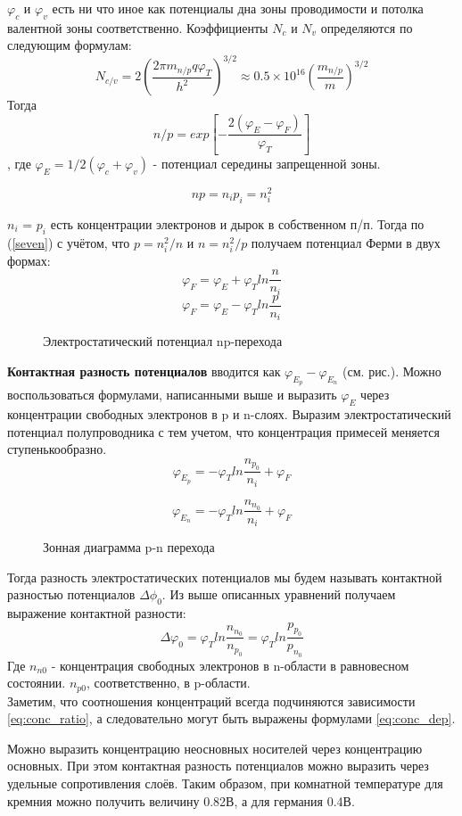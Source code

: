 $\varphi_c$ и $\varphi_v$ есть ни что иное как потенциалы дна зоны проводимости и потолка валентной зоны соответственно. Коэффициенты $N_c$ и $N_v$ определяются по следующим формулам:
$$
N_{c/v} = 2\left(\frac{2\pi m_{n/p}q\varphi_T}{h^2}\right)^{3/2} \approx 0.5\times10^{16}\left(\frac{m_{n/p}}{m}\right)^{3/2}
$$
Тогда
\begin{equation}
n/p = exp\left[-\frac{2(\varphi_E - \varphi_F)}{\varphi_T}\right]
\label{seven}
\end{equation},
где $\varphi_E = 1/2(\varphi_c + \varphi_v)$ - потенциал середины запрещенной зоны.

$$
np = n_ip_i=n_i^2
$$

$n_i$ = $p_i$ есть концентрации электронов и дырок в собственном п/п. Тогда по (\ref{seven}) с учётом, что $p=n_i^2/n$ и $n = n_i^2/p$ получаем потенциал Ферми в двух формах:
$$
\varphi_F = \varphi_E + \varphi_Tln\frac{n}{n_i}
$$
$$
\varphi_F = \varphi_E - \varphi_Tln\frac{p}{n_i}
$$


\begin{center}
	\begin{figure}[h!]
		\caption{Электростатический потенциал np-перехода}	
		\label{pic:pn-phi}
	\end{figure}
\end{center}


\textbf{Контактная разность потенциалов} вводится как $\varphi_{E_p} - \varphi_{E_n}$ (см. рис.). Можно воспользоваться формулами, написанными выше и выразить $\varphi_E$ через концентрации свободных электронов в p и n-слоях.
Выразим электростатический потенциал полупроводника с тем учетом, что концентрация примесей меняется ступенькообразно.\\
$$
\varphi_{E_p} = -\varphi_Tln\frac{n_{p_0}}{n_i} + \varphi_F
$$

$$
\varphi_{E_n} = -\varphi_Tln\frac{n_{n_0}}{n_i} + \varphi_F
$$ 

\begin{center}
	\begin{figure}[h!]
		\caption{Зонная диаграмма p-n перехода}	
		\label{2D}
	\end{figure}
\end{center}


Тогда разность электростатических потенциалов мы будем называть контактной разностью потенциалов $ \Delta \phi_0$. Из выше описанных уравнений получаем выражение контактной разности:
\begin{equation}
\Delta\varphi_0 = \varphi_Tln\frac{n_{n_0}}{n_{p_0}} = \varphi_Tln\frac{p_{p_0}}{p_{n_0}}
\label{eq:main2side_ratio}
\end{equation}
Где $n_{n0}$ - концентрация свободных электронов в n-области в равновесном состоянии. $n_{p0}$, соответственно, в p-области.\\
Заметим, что соотношения концентраций всегда подчиняются зависимости \ref{eq:conc_ratio}, а следовательно могут быть выражены формулами \ref{eq:conc_dep}.


Можно выразить концентрацию неосновных носителей через концентрацию основных. При этом контактная разность потенциалов можно выразить через удельные сопротивления слоёв. Таким образом, при комнатной температуре для кремния можно получить величину 0.82В, а для германия 0.4В.
\pagebreak
